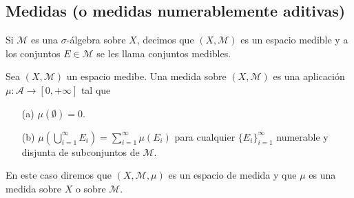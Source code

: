 \subsection{Medidas (o medidas numerablemente aditivas)}
\begin{defi}
Si $\mathcal{M}$ es una $\sigma$-álgebra sobre $X$, decimos que $(X, \mathcal{M})$ es un espacio medible y a los conjuntos $E \in \mathcal{M}$ se les llama conjuntos medibles.
\end{defi}
\begin{defi}
Sea $(X, \mathcal{M})$ un espacio medibe. Una medida sobre $(X, \mathcal{M})$ es una aplicación $\mu : \mathcal{A} \longrightarrow [0, +\infty]$ tal que
\begin{enumerate}
    \item[(a)] $\mu (\emptyset) = 0$.
    \item[(b)] $\mu \left(\bigcup_{i=1}^{\infty}{E_i} \right) = \sum_{i=1}^{\infty} \mu(E_i)$ para cualquier $\{ E_i \}_{i=1}^{\infty}$ numerable y disjunta de subconjuntos de $\mathcal{M}$.
\end{enumerate}
En este caso diremos que $(X, \mathcal{M}, \mu)$ es un espacio de medida y que $\mu$ es una medida sobre $X$ o sobre $\mathcal{M}$.
\end{defi}
